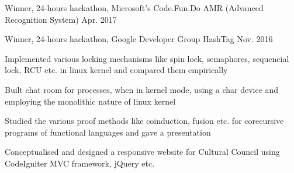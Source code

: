 \documentclass[11pt, a4paper]{cv}
\begin{document}

\begin{cventries}

  \cventry
    {Winner, 24-hours hackathon, Microsoft's Code.Fun.Do} %
    {AMR (Advanced Recognition System)} %
    {} %
    {Apr. 2017} %
    {
      \begin{cvitems} %
        \item {}
      \end{cvitems}
    }

%
  \cventry
    {Winner, 24-hours hackathon, Google Developer Group} %
    {HashTag} %
    {} %
    {Nov. 2016} %
    {
      \begin{cvitems} %
        \item {}
      \end{cvitems}
    }

\end{cventries}


\begin{cventries}

    \begin{cvitems} %
        \item {Implemented various locking mechanisms like spin lock, semaphores, sequencial lock, RCU etc. in linux kernel and compared them empirically}
        \item {Built chat room for processes, when in kernel mode, using a char device and employing the monolithic nature of linux kernel}
        \item {Studied the various proof methods like coinduction, fusion etc. for corecursive programs of functional languages and gave a presentation}
        \item {Conceptualised and designed a responsive website for Cultural Council using CodeIgniter MVC framework, jQuery etc.}
    \end{cvitems}

\end{cventries}
\end{document}
